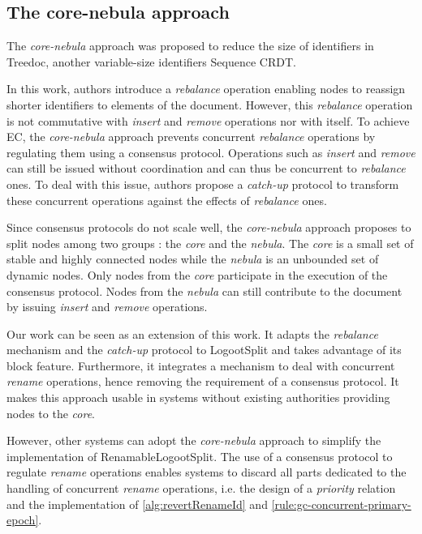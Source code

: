 \documentclass[sigplan,10pt]{acmart}
\newcommand{\ie}{i.e. }
\begin{document}
\subsection{The core-nebula approach}

The \emph{core-nebula} approach \cite{letia:hal-01248270, zawirski:hal-01248197} was proposed to reduce the size of identifiers in Treedoc\cite{5158449}, another variable-size identifiers Sequence \ac{CRDT}.

In this work, authors introduce a \emph{rebalance} operation enabling nodes to reassign shorter identifiers to elements of the document.
However, this \emph{rebalance} operation is not commutative with \emph{insert} and \emph{remove} operations nor with itself.
To achieve \ac{EC}\cite{10.1145/224057.224070}, the \emph{core-nebula} approach prevents concurrent \emph{rebalance} operations by regulating them using a consensus protocol.
Operations such as \emph{insert} and \emph{remove} can still be issued without coordination and can thus be concurrent to \emph{rebalance} ones.
To deal with this issue, authors propose a \emph{catch-up} protocol to transform these concurrent operations against the effects of \emph{rebalance} ones.

Since consensus protocols do not scale well, the \emph{core-nebula} approach proposes to split nodes among two groups : the \emph{core} and the \emph{nebula}.
The \emph{core} is a small set of stable and highly connected nodes while the \emph{nebula} is an unbounded set of dynamic nodes.
Only nodes from the \emph{core} participate in the execution of the consensus protocol.
Nodes from the \emph{nebula} can still contribute to the document by issuing \emph{insert} and \emph{remove} operations.

Our work can be seen as an extension of this work.
It adapts the \emph{rebalance} mechanism and the \emph{catch-up} protocol to LogootSplit and takes advantage of its block feature.
Furthermore, it integrates a mechanism to deal with concurrent \emph{rename} operations, hence removing the requirement of a consensus protocol.
It makes this approach usable in systems without existing authorities providing nodes to the \emph{core}.

However, other systems can adopt the \emph{core-nebula} approach to simplify the implementation of RenamableLogootSplit.
The use of a consensus protocol to regulate \emph{rename} operations enables systems to discard all parts dedicated to the handling of concurrent \emph{rename} operations, \ie the design of a \emph{priority} relation and the implementation of \autoref{alg:revertRenameId} and \autoref{rule:gc-concurrent-primary-epoch}.
\end{document}
